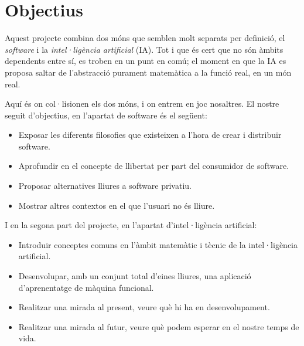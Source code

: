 \section{Objectius}

Aquest projecte combina dos móns que semblen molt separats per definició, el
\emph{software} i la \emph{intel·ligència artificial} (IA). Tot i que és cert
que no són àmbits dependents entre sí, es troben en un punt en comú;
el moment en que la IA es proposa saltar de l'abstracció
purament matemàtica a la funció real, en un món real.

Aquí és on col·lisionen els dos móns, i on entrem en joc nosaltres. El
nostre seguit d'objectius, en l'apartat de software és el següent:


\begin{itemize}
	\item Exposar les diferents filosofies que existeixen a l'hora de
	crear i distribuir software.
	\item Aprofundir en el concepte de llibertat per part
	del consumidor de software.
	\item Proposar alternatives lliures a software privatiu.
	\item Mostrar altres contextos en el que l'usuari no és lliure.
\end{itemize}

I en la segona part del projecte, en l'apartat d'intel·ligència artificial:

\begin{itemize}
	\item Introduir conceptes comuns en l'àmbit matemàtic i tècnic
	de la intel·ligència artificial.
	\item Desenvolupar, amb un conjunt total d'eines lliures, una
	aplicació d'aprenentatge de màquina funcional.
	\item Realitzar una mirada al present, veure què hi ha en
	desenvolupament.
	\item Realitzar una mirada al futur, veure què podem esperar
	en el nostre temps de vida.
\end{itemize}
